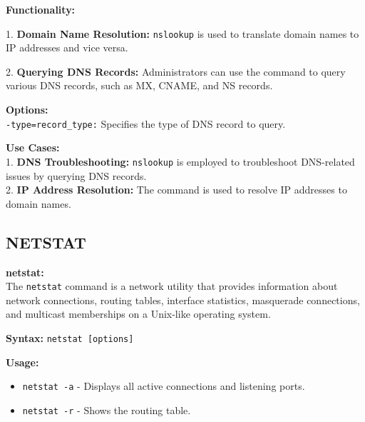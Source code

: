 \documentclass[11pt]{report}
\begin{document}
\vspace{\baselineskip}

\textbf{Functionality:}

1. \textbf{Domain Name Resolution:} \texttt{nslookup} is used to translate domain names to IP addresses and vice versa.

2. \textbf{Querying DNS Records:} Administrators can use the command to query various DNS records, such as MX, CNAME, and NS records.

\vspace{\baselineskip}

\textbf{Options:} \\
\texttt{-type=record\_type:} Specifies the type of DNS record to query.

\vspace{\baselineskip}

\textbf{Use Cases:} \\
1. \textbf{DNS Troubleshooting:} \texttt{nslookup} is employed to troubleshoot DNS-related issues by querying DNS records.\\
2. \textbf{IP Address Resolution:} The command is used to resolve IP addresses to domain names.

\vspace{\baselineskip}

\subsection{NETSTAT}
\textbf{netstat:} \\
The \texttt{netstat} command is a network utility that provides information about network connections, routing tables, interface statistics, masquerade connections, and multicast memberships on a Unix-like operating system.

\vspace{\baselineskip}

\textbf{Syntax:}
\texttt{netstat [options]}

\vspace{\baselineskip}

\textbf{Usage:}
\begin{itemize}
    \item \texttt{netstat -a} - Displays all active connections and listening ports.
    \item \texttt{netstat -r} - Shows the routing table.
\end{itemize}

\vspace{\baselineskip}
\end{document}
